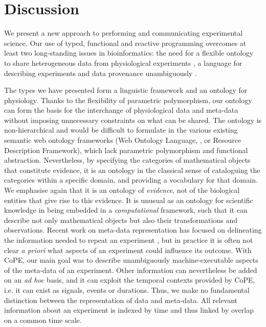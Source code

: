 \section*{Discussion}

We present a new approach to performing and communicating
experimental science.  Our use of
typed, functional and reactive programming overcomes at least two 
long-standing issues in bioinformatics: the need for a flexible
ontology to share heterogeneous data from physiological experiments
\citep{Amari2002}, a language for describing experiments and data provenance unambiguously
\citep{Pool2002, Murray-Rust2002}.

The types we have presented form a linguistic framework and an
ontology for physiology. Thanks to the flexibility of parametric
polymorphism, our ontology can form the basis for the interchange of
physiological data and meta-data without imposing unnecessary
constraints on what can be shared. The ontology is non-hierarchical
and would be difficult to formulate in the various existing semantic
web ontology frameworks (Web Ontology Language, \citep{owlref}, or
Resource Description Framework), which lack parametric polymorphism
and functional abstraction. Nevertheless, by specifying the categories
of mathematical objects that constitute evidence, it is an ontology in
the classical sense of cataloguing the categories within a specific
domain, and providing a vocabulary for that domain. We emphasise again
that it is an ontology of \emph{evidence}, not of the biological
entities that give rise to this evidence. It is unusual as an ontology
for scientific knowledge in being embedded in a \emph{computational}
framework, such that it can describe not only mathematical objects but
also their transformations and observations. Recent work on meta-data
representation \citep{Bower2009} has focused on delineating the
information needed to repeat an experiment \citep{Taylor2007,
  Gibson2008}, but in practice it is often not clear \emph{a priori} what
aspects of an experiment could influence its outcome. With CoPE, our main goal was to 
describe unambiguously machine-executable aspects of the meta-data of an
experiment. Other information can nevertheless be 
added on an \emph{ad hoc} basis, and it can exploit the temporal contexts
provided by CoPE, i.e. it can exist as signals, events or durations. Thus, we
make no fundamental distinction between the representation of data and
meta-data. All relevant information about an experiment is indexed by
time and thus linked by overlap on a common time scale.

